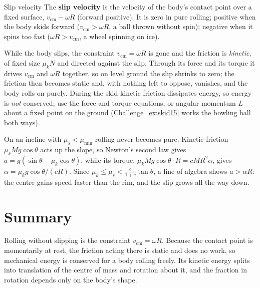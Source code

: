 \begin{defbox}{Slip velocity}
The \textbf{slip velocity} is the velocity of the body's contact point over a fixed surface,
$v_{\text{cm}}-\omega R$ (forward positive). It is zero in pure rolling; positive when the body skids forward
($v_{\text{cm}}>\omega R$, a ball thrown without spin); negative when it spins too fast
($\omega R>v_{\text{cm}}$, a wheel spinning on ice).
\end{defbox}

While the body slips, the constraint $v_{\text{cm}}=\omega R$ is gone and the friction is \emph{kinetic},
of fixed size $\mu_kN$ and directed against the slip. Through its force and its torque it drives $v_{\text{cm}}$ and
$\omega R$ together, so on level ground the slip shrinks to zero; the friction then becomes static and, with
nothing left to oppose, vanishes, and the body rolls on purely. During the skid kinetic friction dissipates
energy, so energy is \emph{not} conserved; use the force and torque equations, or angular
momentum $L$ about a fixed point on the ground (Challenge~\ref{ex:skid15} works the bowling ball both ways).

On an incline with $\mu_s<\mu_{\min}$ rolling never becomes pure. Kinetic friction $\mu_kMg\cos\theta$ acts up
the slope, so Newton's second law gives $a=g(\sin\theta-\mu_k\cos\theta)$, while its torque,
$\mu_kMg\cos\theta\cdot R=cMR^2\alpha$, gives $\alpha=\mu_kg\cos\theta/(cR)$. Since
$\mu_k\le\mu_s<\tfrac{c}{1+c}\tan\theta$, a line of algebra shows $a>\alpha R$: the centre gains speed
faster than the rim, and the slip grows all the way down.

\section{Summary}\label{sec:summary15}
Rolling without slipping is the constraint $v_{\text{cm}}=\omega R$. Because the contact point is momentarily at
rest, the friction acting there is static and does no work, so mechanical energy is conserved for a body rolling
freely. Its kinetic energy splits into translation of the centre of mass and rotation about it, and the fraction
in rotation depends only on the body's shape.


